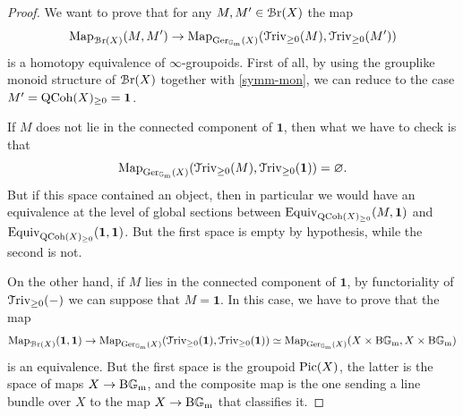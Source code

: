 \documentclass[11pt, twoside]{article} %
\numberwithin{equation}{section}
\theoremstyle{plain}
\theoremstyle{definition}
\newcommand{\Map}{\textup{Map}}
\newcommand{\Gm}{\mathbb G_{\mathrm{m}}}
\newcommand{\QCoh}{\textup{QCoh}}
\newcommand{\BGm}{\textup{B}\Gm}
\newcommand{\Triv}{\mathcal{T}\textup{riv}}
\newcommand{\cBr}{\mathcal{B}\textup{r}}
\newcommand{\Ger}{\textup{Ger}}
\newcommand{\Pic}{\textup{Pic}}
\begin{document}
	\begin{proof}We want to prove that for any $M,M'\in \cBr(X)$ the map $$\Map_{\cBr(X)}(M,M')\to \Map_{\Ger_{\Gm}(X)}(\Triv_{\geq 0}(M),\Triv_{\geq 0}(M'))$$ is a homotopy equivalence of $\infty$-groupoids.
 First of all, by using the grouplike monoid structure of $\cBr(X)$ together with \cref{symm-mon}, we can reduce to the case $M'=\QCoh(X)_{\geq 0}=\mathbf 1$.
		
		If $M$ does not lie in the connected component of $\mathbf 1$, then what we have to check is that   $$\Map_{\Ger_{\Gm}(X)}(\Triv_{\geq 0}(M),\Triv_{\geq 0}(\mathbf 1))=\varnothing.$$ But if this space contained an object, then in particular we would have an equivalence at the level of global sections between $\textup{Equiv}_{\QCoh(X)_{\geq 0}}(M,\mathbf 1)$ and $\textup{Equiv}_{\QCoh(X)_{\geq 0}}(\mathbf 1,\mathbf 1)$. But the first space is empty by hypothesis, while the second is not.
		
 
 On the other hand, if $M$ lies in the connected component of $\mathbf 1$, by functoriality of $\Triv_{\geq 0}(-)$ we can suppose that $M=\mathbf 1$. In this case, we have to prove that the map $$\Map_{\cBr(X)}(\mathbf 1, \mathbf 1)\to \Map_{\Ger_{\Gm}(X)}(\Triv_{\geq 0}(\mathbf 1),\Triv_{\geq 0}(\mathbf 1))\simeq \Map_{\Ger_{\Gm}(X)}(X\times \BGm, X\times \BGm)$$ is an equivalence. But the first space is the groupoid $\Pic(X)$, the latter is the space of maps $X\to \BGm$, and the composite map is the one sending a line bundle over $X$ to the map $X\to \BGm$ that classifies it.
	\end{proof}
	
\end{document}
